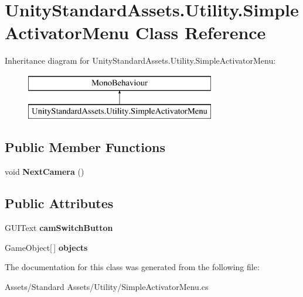 \hypertarget{class_unity_standard_assets_1_1_utility_1_1_simple_activator_menu}{}\section{Unity\+Standard\+Assets.\+Utility.\+Simple\+Activator\+Menu Class Reference}
\label{class_unity_standard_assets_1_1_utility_1_1_simple_activator_menu}
Inheritance diagram for Unity\+Standard\+Assets.\+Utility.\+Simple\+Activator\+Menu\+:\begin{figure}[H]
\begin{center}
\leavevmode
\includegraphics[height=2.000000cm]{class_unity_standard_assets_1_1_utility_1_1_simple_activator_menu}
\end{center}
\end{figure}
\subsection*{Public Member Functions}
\begin{DoxyCompactItemize}
\item 
void {\bfseries Next\+Camera} ()\hypertarget{class_unity_standard_assets_1_1_utility_1_1_simple_activator_menu_a335468ed4d932d4aeb83a676c0a98b0e}{}\label{class_unity_standard_assets_1_1_utility_1_1_simple_activator_menu_a335468ed4d932d4aeb83a676c0a98b0e}

\end{DoxyCompactItemize}
\subsection*{Public Attributes}
\begin{DoxyCompactItemize}
\item 
G\+U\+I\+Text {\bfseries cam\+Switch\+Button}\hypertarget{class_unity_standard_assets_1_1_utility_1_1_simple_activator_menu_aeaeb5037872f98352277bb5772375866}{}\label{class_unity_standard_assets_1_1_utility_1_1_simple_activator_menu_aeaeb5037872f98352277bb5772375866}

\item 
Game\+Object\mbox{[}$\,$\mbox{]} {\bfseries objects}\hypertarget{class_unity_standard_assets_1_1_utility_1_1_simple_activator_menu_a9f0191f5419960fe0445a392ac244318}{}\label{class_unity_standard_assets_1_1_utility_1_1_simple_activator_menu_a9f0191f5419960fe0445a392ac244318}

\end{DoxyCompactItemize}


The documentation for this class was generated from the following file\+:\begin{DoxyCompactItemize}
\item 
Assets/\+Standard Assets/\+Utility/Simple\+Activator\+Menu.\+cs\end{DoxyCompactItemize}
